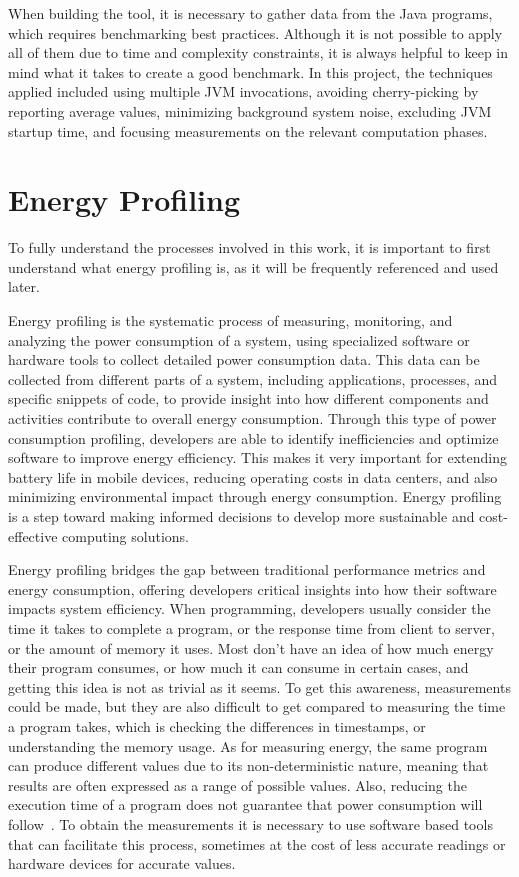 When building the tool, it is necessary to gather data from the Java programs, which requires benchmarking best practices. Although it is not possible to apply all of them due to time and complexity constraints, it is always helpful to keep in mind what it takes to create a good benchmark. In this project, the techniques applied included using multiple JVM invocations, avoiding cherry-picking by reporting average values, minimizing background system noise, excluding JVM startup time, and focusing measurements on the relevant computation phases.



\section{Energy Profiling} \label{sec:background_energy_profiling}

To fully understand the processes involved in this work, it is important to first understand what energy profiling is, as it will be frequently referenced and used later.

Energy profiling is the systematic process of measuring, monitoring, and analyzing the power consumption of a system, using specialized software or hardware tools to collect detailed power consumption data. This data can be collected from different parts of a system, including applications, processes, and specific snippets of code, to provide insight into how different components and activities contribute to overall energy consumption. Through this type of power consumption profiling, developers are able to identify inefficiencies and optimize software to improve energy efficiency. This makes it very important for extending battery life in mobile devices, reducing operating costs in data centers, and also minimizing environmental impact through energy consumption. Energy profiling is a step toward making informed decisions to develop more sustainable and cost-effective computing solutions.

Energy profiling bridges the gap between traditional performance metrics and energy consumption, offering developers critical insights into how their software impacts system efficiency.
When programming, developers usually consider the time it takes to complete a program, or the response time from client to server, or the amount of memory it uses. Most don't have an idea of how much energy their program consumes, or how much it can consume in certain cases, and getting this idea is not as trivial as it seems. To get this awareness, measurements could be made, but they are also difficult to get compared to measuring the time a program takes, which is checking the differences in timestamps, or understanding the memory usage. As for measuring energy, the same program can produce different values due to its non-deterministic nature, meaning that results are often expressed as a range of possible values. Also, reducing the execution time of a program does not guarantee that power consumption will follow~\cite{10.1145/3136014.3136031}. To obtain the measurements it is necessary to use software based tools that can facilitate this process, sometimes at the cost of less accurate readings or hardware devices for accurate values.

